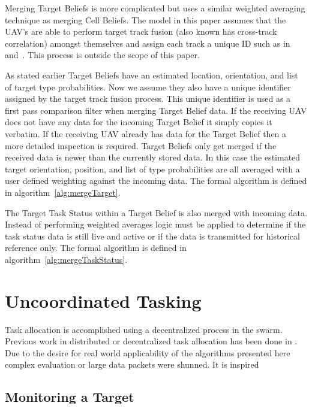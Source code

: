 Merging Target Beliefs is more complicated but uses a similar weighted averaging technique as merging Cell Beliefs.  The model in this paper assumes that the UAV's are able to perform target track fusion (also known has cross-track correlation) amongst themselves and assign each track a unique ID such as in~\cite{stroupe} and~\cite{spillings}.  This process is outside the scope of this paper.

As stated earlier Target Beliefs have an estimated location, orientation, and list of target type probabilities.  Now we assume they also have a unique identifier assigned by the target track fusion process.  This unique identifier is used as a first pass comparison filter when merging Target Belief data.  If the receiving UAV does not have any data for the incoming Target Belief it simply copies it verbatim.  If the receiving UAV already has data for the Target Belief then a more detailed inspection is required.  Target Beliefs only get merged if the received data is newer than the currently stored data.  In this case the estimated target orientation, position, and list of type probabilities are all averaged with a user defined weighting against the incoming data.  The formal algorithm is defined in algorithm~\ref{alg:mergeTarget}.

The Target Task Status within a Target Belief is also merged with incoming data.  Instead of performing weighted averages logic must be applied to determine if the task status data is still live and active or if the data is transmitted for historical reference only.  The formal algorithm is defined in algorithm~\ref{alg:mergeTaskStatus}.

\section{Uncoordinated Tasking}
\label{sec:uncoordTasking}

Task allocation is accomplished using a decentralized process in the swarm.  Previous work in distributed or decentralized task allocation has been done in . Due to the desire for real world applicability of the algorithms presented here complex evaluation or large data packets were shunned. It is inspired


\subsection{Monitoring a Target}

